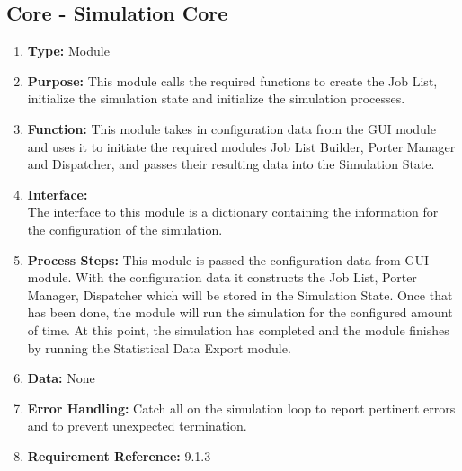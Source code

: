 \documentclass[paper=letter, fontsize=10pt]{scrartcl}
\numberwithin{equation}{section}		%
\numberwithin{figure}{section}			%
\numberwithin{table}{section}				%
\begin{document}
\subsection{Core - Simulation Core}
\begin{enumerate}[]
	\item \textbf{Type:} Module
	\item \textbf{Purpose:} This module calls the required functions to create the Job List, initialize the simulation state and initialize the simulation processes.
	\item \textbf{Function:} This module takes in configuration data from the GUI module and uses it to initiate the required modules Job List Builder, Porter Manager and Dispatcher, and passes their resulting data into the Simulation State.
	\item \textbf{Interface:}\\ 
	The interface to this module is a dictionary containing the information for the configuration of the simulation.
	
	\item \textbf{Process Steps:} This module is passed the configuration data from GUI module. With the configuration data it constructs the Job List, Porter Manager, Dispatcher which will be stored in the Simulation State. Once that has been done, the module will run the simulation for the configured amount of time. At this point, the simulation has completed and the module finishes by running the Statistical Data Export module.
	\item \textbf{Data:} None
	\item \textbf{Error Handling:} Catch all on the simulation loop to report pertinent errors and to prevent unexpected termination. 
	\item \textbf{Requirement Reference:} 9.1.3
\end{enumerate}
\end{document}
